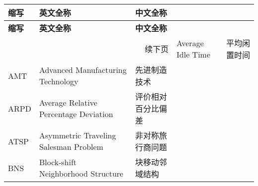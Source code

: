 \begin{abbreviation}


\begin{longtable}[c]{l*{3}{l}} %
	\textbf{缩写} & \textbf{英文全称} & \textbf{中文全称} \vspace{6pt}\\
\endfirsthead
	\textbf{缩写} & \textbf{英文全称} & \textbf{中文全称} \vspace{6pt}\\
\endhead
\multicolumn{3}{r}{续下页}
\endfoot
\endlastfoot
    AIT   & Average Idle Time & 平均闲置时间 \\
    AMT   & Advanced Manufacturing Technology & 先进制造技术 \\
    ARPD  & Average Relative Percentage Deviation & 评价相对百分比偏差 \\
    ATSP  & Asymmetric Traveling Salesman Problem & 非对称旅行商问题 \\
    BNS   & Block-shift Neighborhood Structure & 块移动邻域结构 \\

\end{longtable}


\end{abbreviation}

